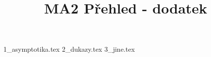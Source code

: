 \documentclass[a4paper]{article}
\begin{document}
\title{MA2 Přehled - dodatek}

\maketitle
\pagebreak

{1_asymptotika.tex}
{2_dukazy.tex}
{3_jine.tex}
\end{document}

